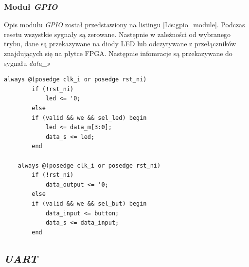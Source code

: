 \documentclass[11pt,a4paper]{article}
\begin{document}
\subsubsection{Moduł \textit{GPIO}}		
	\hspace{5mm}	 Opis modułu \textit{GPIO} został przedstawiony na listingu \ref{Lis:gpio_module}. Podczas resetu wszystkie sygnały są zerowane. Następnie w zależności od wybranego trybu, dane są przekazywane na diody LED lub odczytywane z przełączników znajdujących się na płytce FPGA. Następnie infomracje są przekazywane do sygnału \textit{data\_s}\\
											\begin{minipage}{\textwidth}
\begin{scriptsize}
\begin{lstlisting}[label=Lis:gpio_module,caption=Model \textit{GPIO}]
	always @(posedge clk_i or posedge rst_ni)
		if (!rst_ni)
			led <= '0;
		else
		if (valid && we && sel_led) begin
			led <= data_m[3:0];
			data_s <= led;
		end

	always @(posedge clk_i or posedge rst_ni)
		if (!rst_ni)
			data_output <= '0;
		else
		if (valid && we && sel_but) begin
			data_input <= button;
			data_s <= data_input;
		end
\end{lstlisting}
\end{scriptsize}
\end{minipage}
	\subsection{\textit{UART}}
\end{document}
